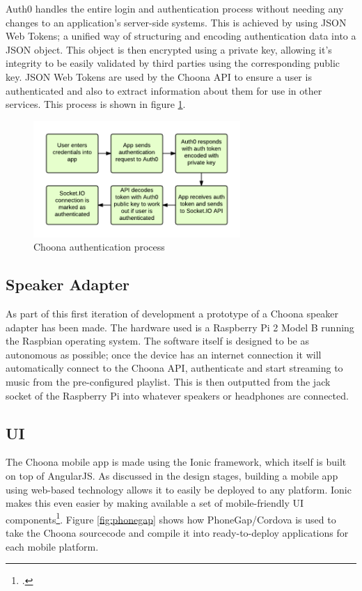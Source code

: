Auth0 handles the entire login and authentication process without needing any changes to an application's server-side systems. This is achieved by using JSON Web Tokens; a unified way of structuring and encoding authentication data into a JSON object. This object is then encrypted using a private key, allowing it's integrity to be easily validated by third parties using the corresponding public key. JSON Web Tokens are used by the Choona API to ensure a user is authenticated and also to extract information about them for use in other services. This process is shown in figure \ref{fig:auth-process}.

\begin{figure}[h!]
  \centering
  \includegraphics[width=0.7\textwidth]{./img/auth-process.png}
  \caption{Choona authentication process}
  \label{fig:auth-process}
\end{figure}


\subsection{Speaker Adapter}

As part of this first iteration of development a prototype of a Choona speaker adapter has been made. The hardware used is a Raspberry Pi 2 Model B running the Raspbian operating system. The software itself is designed to be as autonomous as possible; once the device has an internet connection it will automatically connect to the Choona API, authenticate and start streaming to music from the pre-configured playlist. This is then outputted from the jack socket of the Raspberry Pi into whatever speakers or headphones are connected.

\clearpage
\subsection{UI}

The Choona mobile app is made using the Ionic framework, which itself is built on top of AngularJS. As discussed in the design stages, building a mobile app using web-based technology allows it to easily be deployed to any platform. Ionic makes this even easier by making available a set of mobile-friendly UI components\footcite{ionic}. Figure \ref{fig:phonegap} shows how PhoneGap/Cordova is used to take the Choona sourcecode and compile it into ready-to-deploy applications for each mobile platform.

